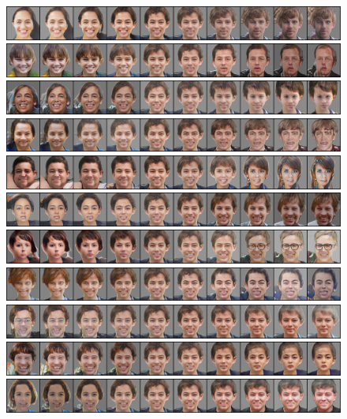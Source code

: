 \documentclass{article}
\begin{document}
\begin{figure}[H]
  \centering
  \includegraphics[width=0.9\linewidth]{eigen/grey_gan_15.png}
  \includegraphics[width=0.9\linewidth]{eigen/grey_gan_16.png}
  \includegraphics[width=0.9\linewidth]{eigen/grey_gan_17.png}
  \includegraphics[width=0.9\linewidth]{eigen/grey_gan_18.png}
  \includegraphics[width=0.9\linewidth]{eigen/grey_gan_19.png}
  \includegraphics[width=0.9\linewidth]{eigen/grey_gan_20.png}
  \includegraphics[width=0.9\linewidth]{eigen/grey_gan_21.png}
  \includegraphics[width=0.9\linewidth]{eigen/grey_gan_22.png}
  \includegraphics[width=0.9\linewidth]{eigen/grey_gan_23.png}
  \includegraphics[width=0.9\linewidth]{eigen/grey_gan_24.png}
  \includegraphics[width=0.9\linewidth]{eigen/grey_gan_25.png}

\end{figure}
\end{document}
